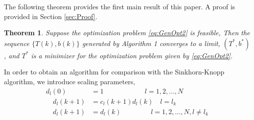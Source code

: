 \documentclass[twocolumn]{article}
\newtheorem{theorem}{Theorem}
\begin{document}


%


The following theorem provides the  first main result of this paper. A proof is provided in Section \ref{sec:Proof}.
\begin{theorem}
\label{th:Genal1}
Suppose the optimization problem \eqref{eq:GenOpt2} is feasible, 
Then the sequence $\{T(k), b(k)\}$  generated by Algorithm 1 converges to a limit, $(T^*, b^*)$, 
and $T^*$ is a minimizer for  the optimization problem   given by \eqref{eq:GenOpt2}.
\end{theorem}


{In order to obtain an algorithm for comparison with the Sinkhorn-Knopp algorithm,} we  introduce scaling parameters,
\begin{align*}
d_l(0) &= 1 	\qquad \qquad \qquad l=1,2,\dots, N\\
\quad  d_l(k+1) &=c_l(k+1)d_l(k) \quad  l=l_k  \\
\quad  d_l(k+1) &=d_l(k)  \, \, \qquad \qquad l=1,2,\dots, N,  l\neq l_k
\end{align*}
\end{document}
